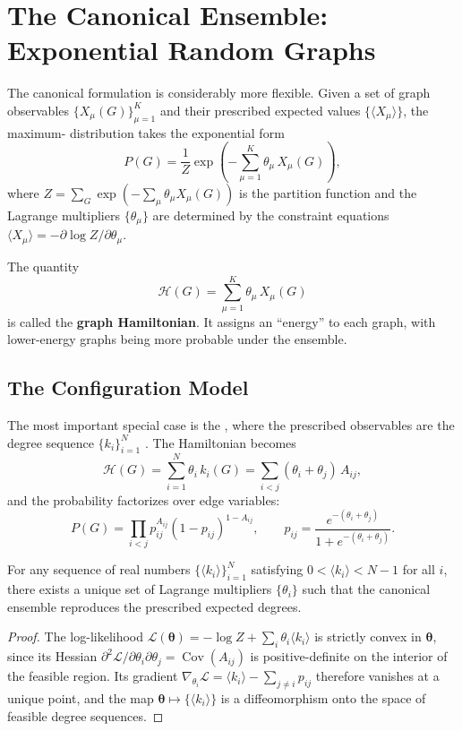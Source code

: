 \section{The Canonical Ensemble: Exponential Random Graphs}

The canonical formulation is considerably more flexible. Given a set of graph observables $\{X_\mu(G)\}_{\mu=1}^{K}$ and their prescribed expected values $\{\langle X_\mu \rangle\}$, the maximum- distribution takes the exponential form
\[
P(G) = \frac{1}{Z} \exp\!\left( -\sum_{\mu=1}^{K} \theta_\mu\, X_\mu(G) \right),
\]
where $Z = \sum_G \exp(-\sum_\mu \theta_\mu X_\mu(G))$ is the partition function and the Lagrange multipliers $\{\theta_\mu\}$ are determined by the constraint equations $\langle X_\mu \rangle = -\partial \log Z / \partial \theta_\mu$.

\begin{definition}
The quantity
\[
\mathcal{H}(G) = \sum_{\mu=1}^{K} \theta_\mu\, X_\mu(G)
\]
is called the \textbf{graph Hamiltonian}. It assigns an ``energy'' to each graph, with lower-energy graphs being more probable under the ensemble.
\end{definition}

\subsection{The Configuration Model}

The most important special case is the , where the prescribed observables are the degree sequence $\{k_i\}_{i=1}^{N}$ . The Hamiltonian becomes
\[
\mathcal{H}(G) = \sum_{i=1}^{N} \theta_i\, k_i(G) = \sum_{i<j} (\theta_i + \theta_j)\, A_{ij},
\]
and the probability factorizes over edge variables:
\[
P(G) = \prod_{i<j} p_{ij}^{A_{ij}} (1 - p_{ij})^{1 - A_{ij}}, \qquad
p_{ij} = \frac{e^{-(\theta_i + \theta_j)}}{1 + e^{-(\theta_i + \theta_j)}}.
\]

\begin{theorem}\label{thm:existence}
For any sequence of real numbers $\{\langle k_i \rangle\}_{i=1}^{N}$ satisfying $0 < \langle k_i \rangle < N-1$ for all $i$, there exists a unique set of Lagrange multipliers $\{\theta_i\}$ such that the canonical ensemble reproduces the prescribed expected degrees.
\end{theorem}

\begin{proof}
The log-likelihood $\mathcal{L}(\boldsymbol{\theta}) = -\log Z + \sum_i \theta_i \langle k_i \rangle$ is strictly convex in $\boldsymbol{\theta}$, since its Hessian $\partial^2 \mathcal{L}/\partial\theta_i\partial\theta_j = \operatorname{Cov}(A_{ij})$ is positive-definite on the interior of the feasible region. Its gradient $\nabla_{\theta_i} \mathcal{L} = \langle k_i \rangle - \sum_{j \neq i} p_{ij}$ therefore vanishes at a unique point, and the map $\boldsymbol{\theta} \mapsto \{\langle k_i \rangle\}$ is a diffeomorphism onto the space of feasible degree sequences.
\end{proof}
